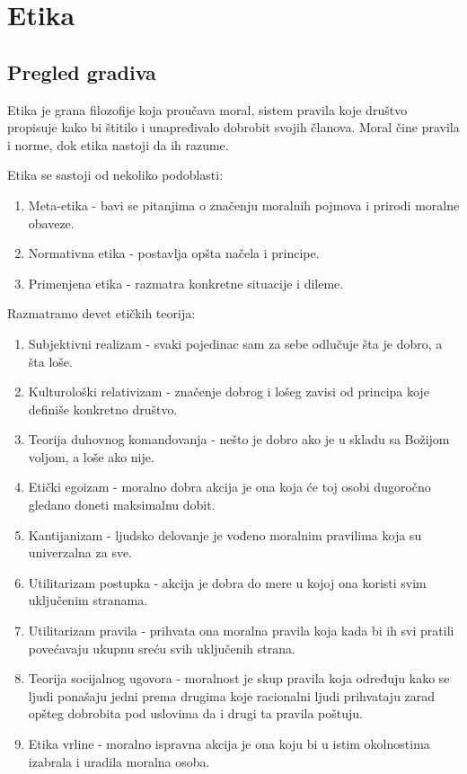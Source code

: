 \documentclass[12pt]{article}
\begin{document}
\section{Etika}

\subsection{Pregled gradiva}
Etika je grana filozofije koja proučava moral, sistem pravila koje društvo propisuje kako bi štitilo i unapređivalo dobrobit svojih članova. Moral čine pravila i norme, dok etika nastoji da ih razume.

Etika se sastoji od nekoliko podoblasti:
\begin{enumerate}
    \item Meta-etika - bavi se pitanjima o značenju moralnih pojmova i prirodi moralne obaveze.
    \item Normativna etika - postavlja opšta načela i principe.
    \item Primenjena etika - razmatra konkretne situacije i dileme.
\end{enumerate}

Razmatramo devet etičkih teorija:
\begin{enumerate}
    \item Subjektivni realizam - svaki pojedinac sam za sebe odlučuje šta je dobro, a šta loše.
    \item Kulturološki relativizam - značenje dobrog i lošeg zavisi od principa koje definiše konkretno društvo.
    \item Teorija duhovnog komandovanja - nešto je dobro ako je u skladu sa Božijom voljom, a loše ako nije.
    \item Etički egoizam - moralno dobra akcija je ona koja će toj osobi dugoročno gledano doneti maksimalnu dobit.
    \item Kantijanizam - ljudsko delovanje je vođeno moralnim pravilima koja su univerzalna za sve.
    \item Utilitarizam postupka - akcija je dobra do mere u kojoj ona koristi svim uključenim stranama.
    \item Utilitarizam pravila - prihvata ona moralna pravila koja kada bi ih svi pratili povećavaju ukupnu sreću svih uključenih strana.
    \item Teorija socijalnog ugovora - moralnost je skup pravila koja određuju kako se ljudi ponašaju jedni prema drugima koje racionalni ljudi prihvataju zarad opšteg dobrobita pod uslovima da i drugi ta pravila poštuju.
    \item Etika vrline - moralno ispravna akcija je ona koju bi u istim okolnostima izabrala i uradila moralna osoba.
\end{enumerate}
\end{document}
